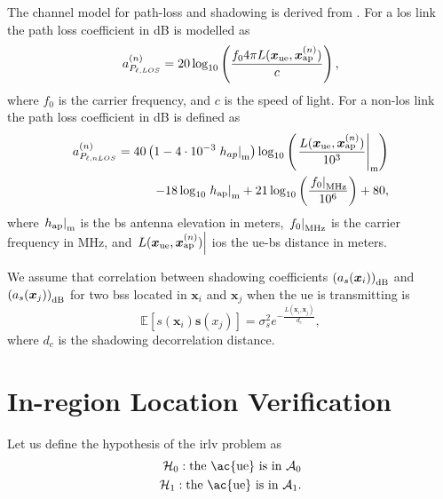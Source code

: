 \documentclass[conference,draftcls,onecolumn]{IEEEtran}
\begin{document}
The channel model for path-loss and shadowing is derived from \cite{3gpp}. For a \ac{los} link the path loss coefficient in dB is modelled as
\begin{equation}\label{eq:los}
    a_{P_{\ell,LOS}}^{(n)} = 20\log_{10}\left(\frac{f_0 4\pi L(\bm{x}_{\rm ue},\bm{x}_{\rm ap}^{(n)})}{c}\right),
\end{equation}
where $f_0$ is the carrier frequency, and $c$ is the speed of light. For a  non-\ac{los} link the path loss coefficient in dB is defined as
\begin{equation}
\begin{split}
    a_{P_{\ell, nLOS}}^{(n)} = 40\left(1-4 \cdot 10^{-3} \left. h_{ap} \right|_{\rm m} \right) \log_{10}\left (\left.\frac{L(\bm{x}_{\rm ue},\bm{x}_{\rm ap}^{(n)})}{10^3}\right|_{\rm m}\right ) \\
    -18\log_{10}\left.h_{\rm ap}\right|_{\rm m}
    + 21\log_{10}\left(\frac{\left.f_0\right|_{\rm MHz}}{10^6}\right) + 80,
    \end{split}
\end{equation}
where $\left.h_{\rm ap}\right|_{\rm m}$ is the \ac{bs} antenna elevation in meters, $\left. f_0 \right|_{\rm MHz}$ is the carrier frequency in MHz, and $\left. L(\bm{x}_{\rm ue},\bm{x}_{\rm ap}^{(n)})\right|$ ios the \ac{ue}-\ac{bs} distance in meters.

We assume that correlation between shadowing coefficients $\left( a_{s}(\bm{x}_i)\right)_{\rm dB}$ and $\left( a_{s}(\bm{x}_j)\right)_{\rm dB}$ for two \acp{bs} located in $\bm{x}_i$ and $\bm{x}_j$ when the \ac{ue} is transmitting is
\begin{equation}\label{eq: coor mat}
    \mathbb{E}[s(\bm{x}_i)\bm{s}(x_j)] = \sigma_s^2e^{-\frac{L(\bm{x}_i,\bm{x}_j)}{d_c}},
\end{equation}
where $d_c$ is the shadowing decorrelation distance. 


\section{In-region Location Verification}\label{sec: ml}
Let us define the hypothesis of the \ac{irlv} problem as
 \begin{equation}
\begin{split}
  \mathcal H_0: \mbox{the \ac{ue} is in $\mathcal{A}_0$} \\
  \mathcal H_1: \mbox{the \ac{ue} is in $\mathcal{A}_1$}. 
  \end{split}
\end{equation}
\end{document}
